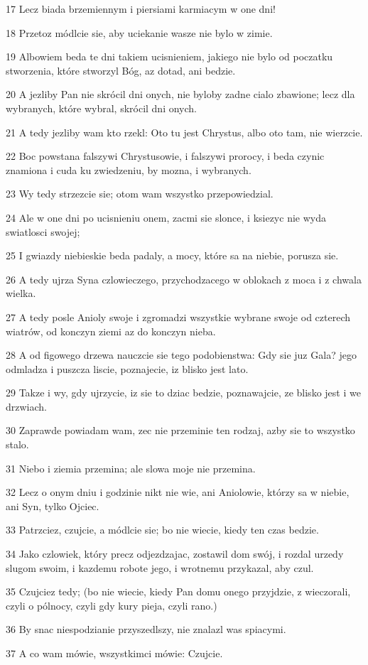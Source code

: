 \par 17 Lecz biada brzemiennym i piersiami karmiacym w one dni!
\par 18 Przetoz módlcie sie, aby uciekanie wasze nie bylo w zimie.
\par 19 Albowiem beda te dni takiem ucisnieniem, jakiego nie bylo od poczatku stworzenia, które stworzyl Bóg, az dotad, ani bedzie.
\par 20 A jezliby Pan nie skrócil dni onych, nie byloby zadne cialo zbawione; lecz dla wybranych, które wybral, skrócil dni onych.
\par 21 A tedy jezliby wam kto rzekl: Oto tu jest Chrystus, albo oto tam, nie wierzcie.
\par 22 Boc powstana falszywi Chrystusowie, i falszywi prorocy, i beda czynic znamiona i cuda ku zwiedzeniu, by mozna, i wybranych.
\par 23 Wy tedy strzezcie sie; otom wam wszystko przepowiedzial.
\par 24 Ale w one dni po ucisnieniu onem, zacmi sie slonce, i ksiezyc nie wyda swiatlosci swojej;
\par 25 I gwiazdy niebieskie beda padaly, a mocy, które sa na niebie, porusza sie.
\par 26 A tedy ujrza Syna czlowieczego, przychodzacego w oblokach z moca i z chwala wielka.
\par 27 A tedy posle Anioly swoje i zgromadzi wszystkie wybrane swoje od czterech wiatrów, od konczyn ziemi az do konczyn nieba.
\par 28 A od figowego drzewa nauczcie sie tego podobienstwa: Gdy sie juz Gala? jego odmladza i puszcza liscie, poznajecie, iz blisko jest lato.
\par 29 Takze i wy, gdy ujrzycie, iz sie to dziac bedzie, poznawajcie, ze blisko jest i we drzwiach.
\par 30 Zaprawde powiadam wam, zec nie przeminie ten rodzaj, azby sie to wszystko stalo.
\par 31 Niebo i ziemia przemina; ale slowa moje nie przemina.
\par 32 Lecz o onym dniu i godzinie nikt nie wie, ani Aniolowie, którzy sa w niebie, ani Syn, tylko Ojciec.
\par 33 Patrzciez, czujcie, a módlcie sie; bo nie wiecie, kiedy ten czas bedzie.
\par 34 Jako czlowiek, który precz odjezdzajac, zostawil dom swój, i rozdal urzedy slugom swoim, i kazdemu robote jego, i wrotnemu przykazal, aby czul.
\par 35 Czujciez tedy; (bo nie wiecie, kiedy Pan domu onego przyjdzie, z wieczorali, czyli o pólnocy, czyli gdy kury pieja, czyli rano.)
\par 36 By snac niespodzianie przyszedlszy, nie znalazl was spiacymi.
\par 37 A co wam mówie, wszystkimci mówie: Czujcie.

